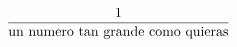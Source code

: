 \documentclass[preview]{standalone}
\begin{document}
\begin{align*}
\frac{1}{\mathrm{un\ numero\ tan\ grande\ \break como\ quieras}}
\end{align*}
\end{document}
